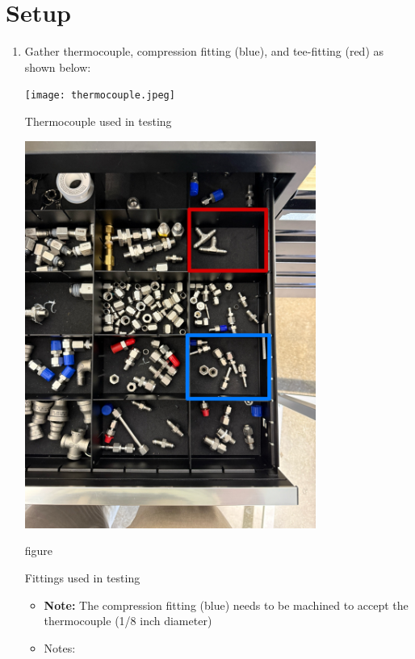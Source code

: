 \documentclass[11pt]{article}
\begin{document}
    \newpage

    \section{Setup}
        \begin{enumerate}
            \item Gather thermocouple, compression fitting (blue), and tee-fitting (red) as shown below: \\
            \begin{minipage}{0.45\textwidth}
                \vspace*{1em}
                \texttt{[image: thermocouple.jpeg]}
                \captionsetup{type=figure}
                \caption{Thermocouple used in testing}
            \end{minipage}
            \hfill
            \begin{minipage}{0.45\textwidth}
                \vspace*{1em}
                \includegraphics[width=0.75\textwidth, angle=90]{fluid_fittings.jpeg}
                \captionsetup{type=figure}
                \caption{figure}{Fittings used in testing}
            \end{minipage}
            \begin{itemize}
                \item \textbf{Note:} The compression fitting (blue) needs to be machined to accept the thermocouple (1/8 inch diameter)
                \item Notes: 
            \end{itemize}


\end{enumerate}
\end{document}
